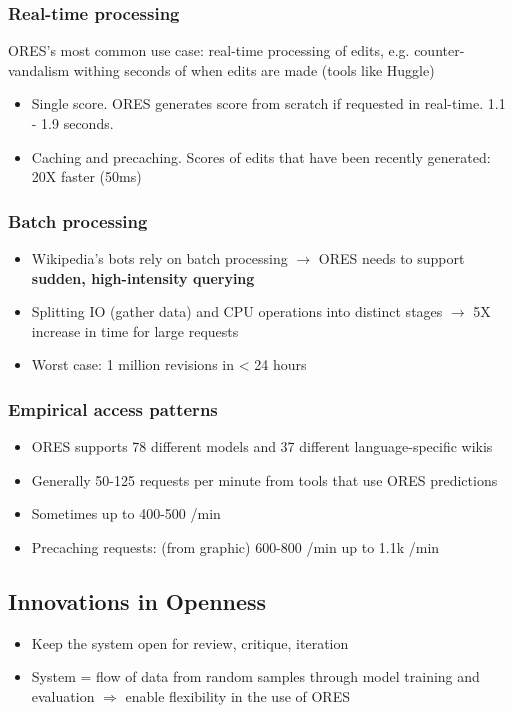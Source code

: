 \documentclass[12pt,a4paper]{article}
\begin{document}
\subsubsection{Real-time processing}
ORES's most common use case: real-time processing of edits, e.g. counter-vandalism withing seconds of when edits are made (tools like Huggle)
\begin{itemize}
\item Single score. ORES generates score from scratch if requested in real-time. 1.1 - 1.9 seconds.
\item Caching and precaching. Scores of edits that have been recently generated: 20X faster (50ms)
\end{itemize}
\subsubsection{Batch processing}
\begin{itemize}
\item Wikipedia's bots rely on batch processing \(\rightarrow\) ORES needs to support \textbf{sudden, high-intensity querying}
\item Splitting IO (gather data) and CPU operations into distinct stages \(\rightarrow\) 5X increase in time for large requests
\item Worst case: 1 million revisions in < 24 hours
\end{itemize}
\subsubsection{Empirical access patterns}
\begin{itemize}
\item ORES supports 78 different models and 37 different language-specific wikis
\item Generally 50-125 requests per minute from tools that use ORES predictions
\item Sometimes up to 400-500 /min
\item Precaching requests: (from graphic) 600-800 /min up to 1.1k /min
\end{itemize}
\subsection{Innovations in Openness}
\begin{itemize}
\item Keep the system open for review, critique, iteration
\item System = flow of data from random samples through model training and evaluation
\(\Rightarrow\) enable flexibility in the use of ORES
\end{itemize}
\end{document}
